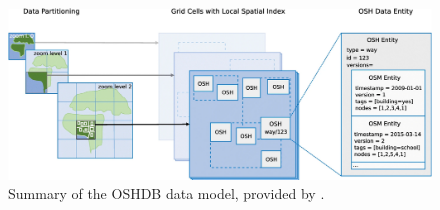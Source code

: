 \begin{figure} %
    \centering %
    \includegraphics[width = \textwidth]{Images/oshdb.PNG} %
    \caption[Summary of the OSHDB data model]{Summary of the OSHDB data model, provided by \textcite{raifer_oshdb_2019}.} %
    \label{fig:oshdb} %
\end{figure}




    


